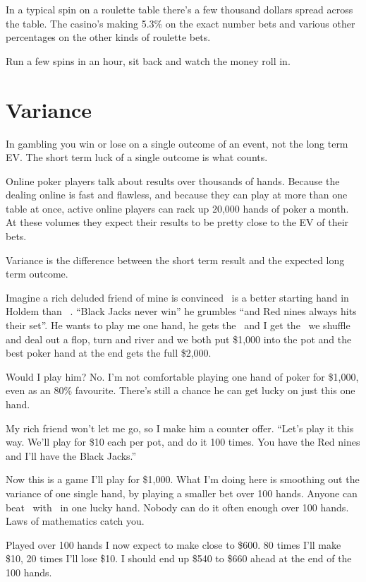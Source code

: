 In a typical spin on a roulette table there's a few thousand dollars
spread across the table. The casino's making 5.3\% on the exact number
bets and various other percentages on the other kinds of roulette bets.

Run a few spins in an hour, sit back and watch the money roll in.

\section{Variance}

In gambling you win or lose on a single outcome of an event,
not the long term EV. The short term luck of a single outcome
is what counts.

Online poker players talk about results over thousands of hands. Because the
dealing online is fast and flawless, and because they can play at
more than one table at once, active online players can rack up
20,000 hands of poker a month. At these volumes they expect their
results to be pretty close to the EV of their bets.

Variance is the difference between the short term result and the
expected long term outcome.

Imagine a rich deluded friend of mine is convinced \nineh\nined\ is a better
starting hand in Holdem than \Jc\Js\ . ``Black Jacks never win'' he grumbles
``and Red nines always hits their set''. He wants to play me one hand, he
gets the \nineh\nined\ and I get the \Jc\Js\, we shuffle and deal out a flop,
turn and river and we both put \$1,000 into the pot and the best
poker hand at the end gets the full \$2,000.

Would I play him? No. I'm not comfortable playing one hand of poker
for \$1,000, even as an 80\% favourite. There's still a chance he can get
lucky on just this one hand.

My rich friend won't let me go, so I make him a counter offer.
``Let's play it this way. We'll play for \$10 each per pot, and do
it 100 times. You have the Red nines and I'll have the Black Jacks.''

Now this is a game I'll play for \$1,000. What I'm doing here is smoothing
out the variance of one single hand, by playing a smaller bet over
100 hands. Anyone can beat \Jc\Js\ with \nineh\nined\ in one lucky
hand. Nobody can do it often enough over 100 hands. Laws of mathematics
catch you.

Played over 100 hands I now expect to make close to \$600. 80 times I'll
make \$10, 20 times I'll lose \$10. I should end up \$540 to \$660 ahead
at the end of the 100 hands.

